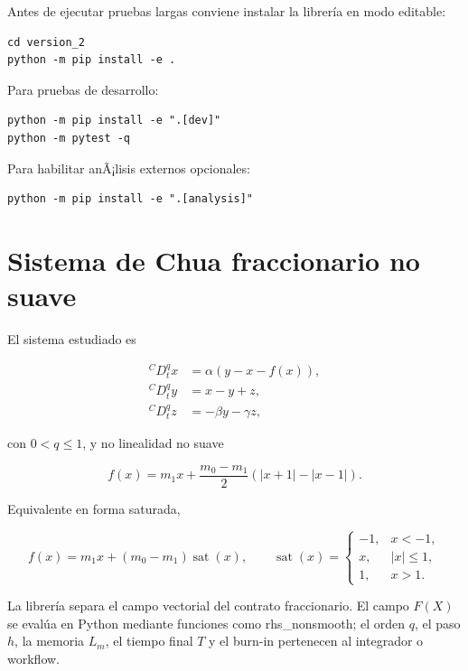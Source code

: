 \documentclass[11pt]{article}
\DeclareRobustCommand{\codepath}[1]{\begingroup\Urlmuskip=0mu plus 2mu\path{#1}\endgroup}
\def\codepath#1{#1}%
\begin{document}
Antes de ejecutar pruebas largas conviene instalar la librería en modo editable:

\begin{lstlisting}
cd version_2
python -m pip install -e .
\end{lstlisting}

Para pruebas de desarrollo:

\begin{lstlisting}
python -m pip install -e ".[dev]"
python -m pytest -q
\end{lstlisting}

Para habilitar anÃ¡lisis externos opcionales:

\begin{lstlisting}
python -m pip install -e ".[analysis]"
\end{lstlisting}

\section{Sistema de Chua fraccionario no suave}

El sistema estudiado es

\begin{align}
{}^C D_t^q x &= \alpha\left(y-x-f(x)\right),\\
{}^C D_t^q y &= x-y+z,\\
{}^C D_t^q z &= -\beta y-\gamma z,
\end{align}

con \(0<q\leq 1\), y no linealidad no suave

\begin{equation}
f(x)=m_1x+\frac{m_0-m_1}{2}\left(|x+1|-|x-1|\right).
\end{equation}

Equivalente en forma saturada,

\begin{equation}
f(x)=m_1x+(m_0-m_1)\operatorname{sat}(x),
\qquad
\operatorname{sat}(x)=
\begin{cases}
-1,&x<-1,\\
x,&|x|\leq 1,\\
1,&x>1.
\end{cases}
\end{equation}

La librería separa el campo vectorial del contrato fraccionario. El campo \(F(X)\) se evalúa en Python mediante funciones como \codepath{rhs_nonsmooth}; el orden \(q\), el paso \(h\), la memoria \(L_m\), el tiempo final \(T\) y el burn-in pertenecen al integrador o workflow.
\end{document}
